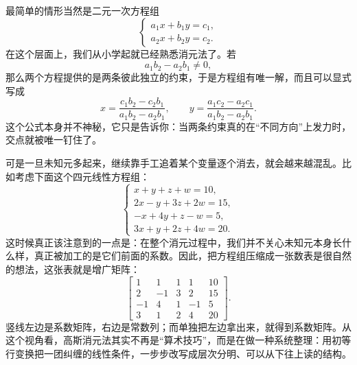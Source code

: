 \documentclass[UTF8]{ctexbook}
\begin{document}
最简单的情形当然是二元一次方程组
\begin{equation*}
\begin{cases}
 a_1x+b_1y=c_1,\\
 a_2x+b_2y=c_2.
\end{cases}
\end{equation*}
在这个层面上，我们从小学起就已经熟悉消元法了。若
\[
a_1b_2-a_2b_1\neq 0,
\]
那么两个方程提供的是两条彼此独立的约束，于是方程组有唯一解，而且可以显式写成
\begin{equation*}
 x=\frac{c_1b_2-c_2b_1}{a_1b_2-a_2b_1},\qquad
 y=\frac{a_1c_2-a_2c_1}{a_1b_2-a_2b_1}.
\end{equation*}
这个公式本身并不神秘，它只是告诉你：当两条约束真的在“不同方向”上发力时，交点就被唯一钉住了。

可是一旦未知元多起来，继续靠手工追着某个变量逐个消去，就会越来越混乱。比如考虑下面这个四元线性方程组：
\begin{equation*}
\begin{cases}
x+y+z+w=10,\\
2x-y+3z+2w=15,\\
-x+4y+z-w=5,\\
3x+y+2z+4w=20.
\end{cases}
\end{equation*}
这时候真正该注意到的一点是：在整个消元过程中，我们并不关心未知元本身长什么样，真正被加工的是它们前面的系数。因此，把方程组压缩成一张数表是很自然的想法，这张表就是增广矩阵：
\[
\left[
\begin{array}{cccc|c}
1&1&1&1&10\\
2&-1&3&2&15\\
-1&4&1&-1&5\\
3&1&2&4&20
\end{array}
\right].
\]
竖线左边是系数矩阵，右边是常数列；而单独把左边拿出来，就得到系数矩阵。从这个视角看，高斯消元法其实不再是“算术技巧”，而是在做一种系统整理：用初等行变换把一团纠缠的线性条件，一步步改写成层次分明、可以从下往上读的结构。
\end{document}
